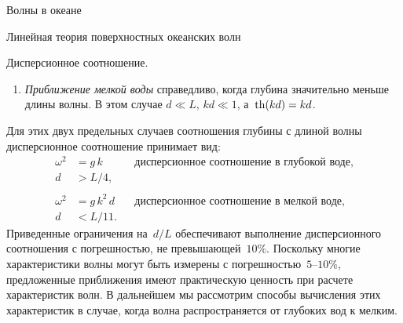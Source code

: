 \begin{chapter}{Волны в океане}
\begin{section}{Линейная теория поверхностных океанских волн}
\begin{paragraph}{Дисперсионное соотношение.}
\begin{enumerate}
\item \emph{Приближение мелкой воды} справедливо, когда глубина значительно
меньше длины волны. В этом случае $d \ll L$, $kd \ll 1$, а~$\mathop{\mathrm{th}}\nolimits (kd) = kd$.
%
\end{enumerate}
Для этих двух предельных случаев соотношения глубины с длиной волны
дисперсионное соотношение принимает вид:
%
\begin{align}
  \omega ^2 &= g \, k & & \text{дисперсионное соотношение в глубокой воде,} \label{eq:16.4}\\
  d &> L/4, & &  \nonumber \\
   & & \nonumber \\
  \omega ^2 &= g \, k^{2} \, d & & \text{дисперсионное соотношение в мелкой воде,}\label{eq:16.5}\\
   d &< L/11. & & \nonumber
\end{align}
Приведенные ограничения на~$d/L$ обеспечивают выполнение дисперсионного 
соотношения с погрешностью, не превышающей~$10\%$. Поскольку многие 
характеристики волны могут быть измерены с погрешностью~$5$--$10\%$, 
предложенные приближения имеют практическую ценность при расчете 
характеристик волн. В дальнейшем мы рассмотрим способы вычисления 
этих характеристик в случае, когда волна распространяется 
от глубоких вод к мелким.
%
\end{paragraph}


\end{section}
\end{chapter}

